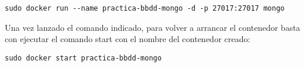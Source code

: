 \begin{verbatim}
sudo docker run --name practica-bbdd-mongo -d -p 27017:27017 mongo
\end{verbatim}

Una vez lanzado el comando indicado, para volver a arrancar el contenedor basta con ejecutar el comando start con el nombre del contenedor creado:

\begin{verbatim}
sudo docker start practica-bbdd-mongo
\end{verbatim}
